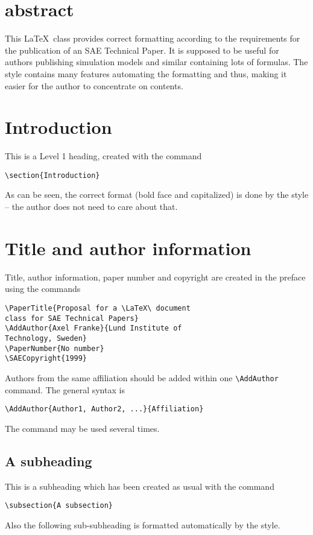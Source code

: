 \documentclass[letterpaper]{sae}
\begin{document}
\maketitle
\section{abstract}
  This \LaTeX\ class provides correct formatting according to the requirements
  for the publication of an SAE Technical Paper. It is supposed to be useful
  for authors publishing simulation models and similar containing lots of
  formulas. The style contains many features automating the formatting and
  thus, making it easier for the author to concentrate on contents. 

\section{Introduction}
This is a Level 1 heading, created with the command
\begin{verbatim}
\section{Introduction}
\end{verbatim}
As can be seen, the correct format (bold face and capitalized) is done by the
style -- the author does not need to care about that.

\section{Title and author information}
Title, author information, paper number and copyright are created in the
preface using the commands
\begin{verbatim}
\PaperTitle{Proposal for a \LaTeX\ document 
class for SAE Technical Papers}
\AddAuthor{Axel Franke}{Lund Institute of 
Technology, Sweden}
\PaperNumber{No number}
\SAECopyright{1999}
\end{verbatim}
Authors from the same affiliation should be added within one
\verb+\AddAuthor+ command. The general syntax is
\begin{verbatim}
\AddAuthor{Author1, Author2, ...}{Affiliation}
\end{verbatim}
The command may be used several times.


\subsection{A subheading}
This is a subheading which has been created as usual with the command
\begin{verbatim}
\subsection{A subsection}
\end{verbatim}
Also the following sub-subheading is formatted automatically by the style. 
\end{document}
